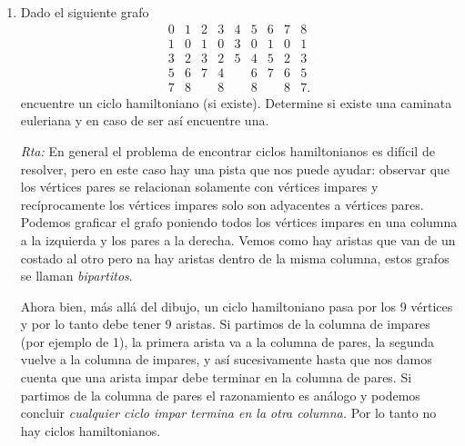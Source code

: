 \documentclass[a4paper,12pt,twoside,spanish,reqno]{amsbook}
\numberwithin{equation}{section}
\newcommand{\rta}{\noindent\textit{Rta: }}
\begin{document}
\begin{enumerate}
\begin{enumerate}
        \rta Los subgrafos con vértices $\{1,6,12,9 \}$, $\{4,2,5 \}$ y $\{3,7,11,10,8 \}$ son las componentes conexas de (7).
        
    
    \end{enumerate}

    

    \item\label{ej-ciclo-hamiltoniano} Dado el siguiente grafo
    $$
    \begin{matrix}
    0&1&2&3&4&5&6&7&8\\ \hline
    1&0&1&0&3&0&1&0&1\\
    3&2&3&2&5&4&5&2&3\\
    5&6&7&4& &6&7&6&5\\
    7&8& &8& &8& &8&7.
    \end{matrix}
    $$
    encuentre un ciclo hamiltoniano (si existe). Determine si existe una caminata euleriana y en caso de ser así encuentre una. 
    
    \rta En  general el  problema de encontrar ciclos hamiltonianos es difícil de resolver, pero en este caso hay una pista que nos puede ayudar: observar que los vértices pares se relacionan solamente con vértices impares y recíprocamente los vértices impares solo son adyacentes a vértices pares. Podemos graficar el grafo  poniendo todos los vértices impares en una columna a la izquierda y los pares a la derecha. Vemos como hay aristas que van de un costado al otro pero  na hay aristas dentro de la misma columna, estos grafos se llaman  \textit{bipartitos}.  
    
    \begin{center}
    \end{center}
    Ahora bien, más allá del dibujo, un ciclo hamiltoniano pasa por los 9 vértices y por lo tanto debe tener 9 aristas. Si partimos de la columna de impares (por ejemplo de 1), la primera arista va a la columna de pares, la segunda vuelve a la columna de impares, y  así sucesivamente hasta que nos damos cuenta que una arista impar debe terminar en la columna de pares. Si  partimos de la columna de pares el razonamiento es análogo y podemos concluir \textit{cualquier ciclo impar termina en la otra columna.} Por lo tanto no hay ciclos hamiltonianos. 
    

\end{enumerate}
\end{document}
